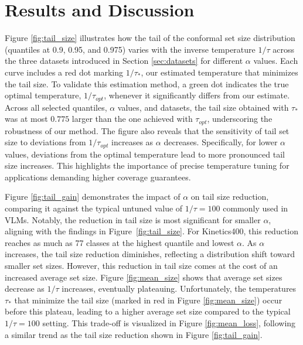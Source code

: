 




\section{Results and Discussion}
Figure \ref{fig:tail_size} illustrates how the tail of the conformal set size distribution (quantiles at 0.9, 0.95, and 0.975) varies with the inverse temperature $1/\tau$ across the three datasets introduced in Section \ref{sec:datasets} for different $\alpha$ values. Each curve includes a red dot marking $1/\tau_*$, our estimated temperature that minimizes the tail size. To validate this estimation method, a green dot indicates the true optimal temperature, $1/\tau_{opt}$, whenever it significantly differs from our estimate. Across all selected quantiles, $\alpha$ values, and datasets, the tail size obtained with $\tau_*$ was at most $0.775$ larger than the one achieved with $\tau_{opt}$, underscoring the robustness of our method. The figure also reveals that the sensitivity of tail set size to deviations from $1/\tau_{opt}$ increases as $\alpha$ decreases. Specifically, for lower $\alpha$ values, deviations from the optimal temperature lead to more pronounced tail size increases. This highlights the importance of precise temperature tuning for applications demanding higher coverage guarantees.



Figure \ref{fig:tail_gain} demonstrates the impact of $\alpha$ on tail size reduction, comparing it against the typical untuned value of $1/\tau=100$ commonly used in VLMs. Notably, the reduction in tail size is most significant for smaller $\alpha$, aligning with the findings in Figure~\ref{fig:tail_size}. For Kinetics400, this reduction reaches as much as 77 classes at the highest quantile and lowest $\alpha$. As $\alpha$ increases, the tail size reduction diminishes, reflecting a distribution shift toward smaller set sizes.
However, this reduction in tail size comes at the cost of an increased average set size. Figure \ref{fig:mean_size} shows that average set sizes decrease as $1/\tau$ increases, eventually plateauing. Unfortunately, the temperatures $\tau_*$ that minimize the tail size (marked in red in Figure \ref{fig:mean_size}) occur before this plateau, leading to a higher average set size compared to the typical $1/\tau=100$ setting. This trade-off is visualized in Figure \ref{fig:mean_loss}, following a similar trend as the tail size reduction shown in Figure \ref{fig:tail_gain}.

